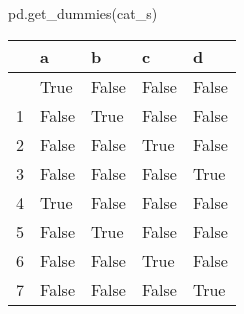 \documentclass[
  letterpaper,
  DIV=11,
  numbers=noendperiod]{scrreprt}
\newenvironment{Shaded}{\begin{snugshade}}{\end{snugshade}}
\newcommand{\NormalTok}[1]{\textcolor[rgb]{0.00,0.23,0.31}{#1}}
\begin{document}
\begin{Shaded}
\begin{Highlighting}[]
\NormalTok{pd.get\_dummies(cat\_s)}
\end{Highlighting}
\end{Shaded}

\begin{longtable}[]{@{}lllll@{}}
\toprule\noalign{}
& a & b & c & d \\
\midrule\noalign{}
\endhead
\bottomrule\noalign{}
\endlastfoot
0 & True & False & False & False \\
1 & False & True & False & False \\
2 & False & False & True & False \\
3 & False & False & False & True \\
4 & True & False & False & False \\
5 & False & True & False & False \\
6 & False & False & True & False \\
7 & False & False & False & True \\
\end{longtable}
\end{document}
